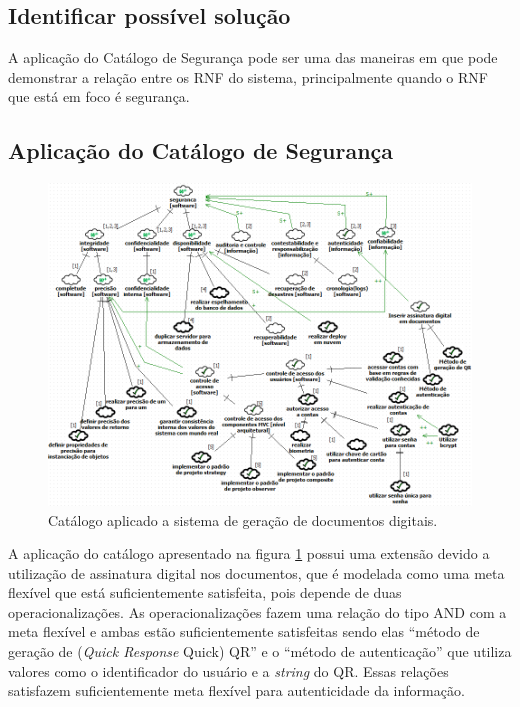 \subsection{Identificar possível solução}

A aplicação do Catálogo de Segurança pode ser uma das maneiras em que pode demonstrar a relação entre os RNF do sistema, principalmente quando o RNF que está em foco é segurança.

\pagebreak

\subsection{Aplicação do Catálogo de Segurança}

\begin{figure}[h!]
	\centering
	\includegraphics[keepaspectratio=true,scale=0.7]{figuras/catalogoPersona4.PNG}
	\caption{Catálogo aplicado a sistema de geração de documentos digitais.}
	\label{catalogoPersona4}
\end{figure}

A aplicação do catálogo apresentado na figura \ref{catalogoPersona4} possui uma extensão devido a utilização de assinatura digital nos documentos, que é modelada como uma meta flexível que está suficientemente satisfeita, pois depende de duas operacionalizações. As operacionalizações fazem uma relação do tipo AND com a meta flexível e ambas estão suficientemente satisfeitas sendo elas “método de geração de (\textit{Quick Response} Quick) QR” e o  “método de autenticação” que utiliza valores como o identificador do usuário e a \textit{string} do QR. Essas relações satisfazem suficientemente meta flexível para autenticidade da informação. 

